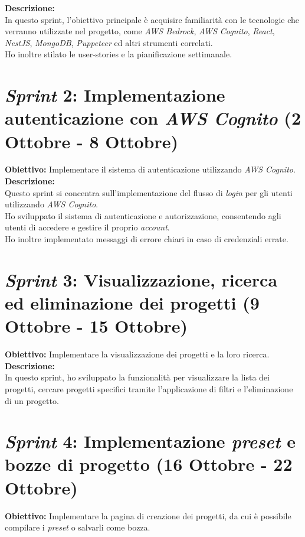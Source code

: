 \noindent \textbf{Descrizione:}\\  
\noindent In questo \gls{sprint}, l'obiettivo principale è acquisire familiarità con le tecnologie che verranno utilizzate nel progetto, come \textit{AWS Bedrock}, \textit{AWS Cognito}, \textit{React}, \textit{NestJS}, \textit{MongoDB}, \textit{Puppeteer} ed altri strumenti correlati.\\
Ho inoltre stilato le \gls{user-stories} e la pianificazione settimanale.\\

\section*{\textit{Sprint} 2: Implementazione autenticazione con \textit{AWS Cognito} (2 Ottobre - 8 Ottobre)}
\textbf{Obiettivo:} Implementare il sistema di autenticazione utilizzando \textit{AWS Cognito}.\\  

\noindent \textbf{Descrizione:}\\  
\noindent Questo \gls{sprint} si concentra sull'implementazione del flusso di \textit{login} per gli utenti utilizzando \textit{AWS Cognito}. \\
Ho sviluppato il sistema di autenticazione e autorizzazione, consentendo agli utenti di accedere e gestire il proprio \textit{account}. \\
Ho inoltre implementato messaggi di errore chiari in caso di credenziali errate.\\

\section*{\textit{Sprint} 3: Visualizzazione, ricerca ed eliminazione dei progetti (9 Ottobre - 15 Ottobre)}
\noindent \textbf{Obiettivo:} Implementare la visualizzazione dei progetti e la loro ricerca.\\

\noindent \textbf{Descrizione:}\\  
\noindent In questo \gls{sprint}, ho sviluppato la funzionalità per visualizzare la lista dei progetti, cercare progetti specifici tramite l’applicazione di filtri e l’eliminazione di un progetto.\\  


\section*{\textit{Sprint} 4: Implementazione \textit{preset} e bozze di progetto (16 Ottobre - 22 Ottobre)}
\textbf{Obiettivo:} Implementare la pagina di creazione dei progetti, da cui è possibile compilare i \textit{preset} o salvarli come bozza.\\

